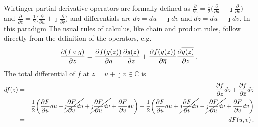 \documentclass[a4paper,10pt,twocolumn]{article}
\newcommand{\cplx}{\mathbb{C}}
\newcommand{\iu}{{\jmath}}
\newcommand{\conj}[1]{\overline{#1}}
\begin{document}
Wirtinger partial derivative operators are formally defined as $
  \tfrac{\partial}{\partial z}
    = \tfrac12 \bigl(
      \tfrac{\partial}{\partial u}
      - \iu \tfrac{\partial}{\partial v}
    \bigr)
$ and $
  \tfrac{\partial}{\partial \conj{z}}
    = \tfrac12 \bigl(
      \tfrac{\partial}{\partial u}
      + \iu \tfrac{\partial}{\partial v}
    \bigr)
$ and differentials are $dz = du + \iu dv$ and $d\conj{z} = du - \iu dv$. In this paradigm
The usual rules of calculus, like chain and product rules, follow directly
from the definition of the operators, e.g.
\begin{equation}
    \frac{\partial (f\circ g)}{\partial z}
    = \frac{\partial f(g(z))}{\partial g} \frac{\partial g(z)}{\partial z}
    + \frac{\partial f(g(z))}{\partial \conj{g}} \frac{\partial \conj{g(z)}}{\partial z}
  \,.  \notag
\end{equation}
The total differential of $f$ at $z = u + \iu v \in \cplx$ is
\begin{eqnarray}  
df(z)
  &=& \frac{\partial f}{\partial z} dz
    + \frac{\partial f}{\partial \conj{z}} d\conj{z}
  \notag \\
  &=& \frac12 \biggl(
     \frac{\partial F}{\partial u} du
     - \cancel{\iu \frac{\partial F}{\partial v} du}
     + \cancel{\iu \frac{\partial F}{\partial u} dv}
     + \frac{\partial F}{\partial v} dv
  \biggr)
  + \frac12 \biggl(
     \frac{\partial F}{\partial u} du
     + \cancel{\iu \frac{\partial F}{\partial v} du}
     - \cancel{\iu \frac{\partial F}{\partial u} dv}
     + \frac{\partial F}{\partial v} dv
  \biggr)
  \notag \\
  &=& dF(u, v)
  \,,  \notag
\end{eqnarray}
\end{document}
